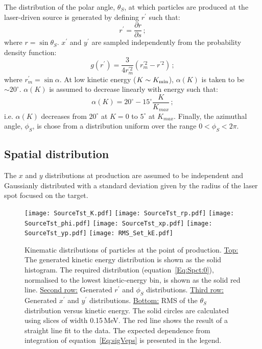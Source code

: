 The distribution of the polar angle, $\theta_S$, at which particles
are produced at the laser-driven source is generated by defining
$r^\prime$ such that:
\begin{equation}
  r^\prime = \frac{\partial r}{\partial s}\,;
\end{equation}
where $r=\sin\theta_S$.
$x^\prime$ and $y^\prime$ are sampled independently from the
probability density function:
\begin{equation}
  g(r^\prime) = \frac{3}{4r^{\prime 2}_m} \left(r^{\prime 2}_m-r^{\prime 2} \right)\,;
\end{equation}
where $r^\prime_m=\sin\alpha$.
At low kinetic energy ($K \sim K_{\rm min}$),
$\alpha(K)$ is taken to be $\sim 20^\circ$.
$\alpha(K)$ is assumed to decrease linearly with energy such
that:
\begin{equation}
  \alpha(K) =
                20^\circ - 15^\circ \frac{K}{K_{max}} \, ;
  \label{Eq:sigVeps}
\end{equation}
i.e. $\alpha(K)$ decreases from $20^\circ$ at $K=0$
to $5^\circ$ at $K_{max}$.
Finally, the azimuthal angle, $\phi_S$, is chose from a distribution
uniform over the range $0 < \phi_S < 2\pi$.

\subsection{Spatial distribution}

The $x$ and $y$ distributions at production are assumed to be
independent and Gaussianly distributed with a standard deviation given
by the radius of the laser spot focused on the target.

\begin{figure}
  \begin{center}
    \texttt{[image: SourceTst\_K.pdf]}
    \texttt{[image: SourceTst\_rp.pdf]}
    \texttt{[image: SourceTst\_phi.pdf]}
    \texttt{[image: SourceTst\_xp.pdf]}
    \texttt{[image: SourceTst\_yp.pdf]}
    \texttt{[image: RMS\_Set\_kE.pdf]}
  \end{center}
  \caption{Kinematic distributions of particles at the point of
    production.
    \underline{Top:} The generated kinetic energy distribution is shown
    as the solid histogram. 
    The required distribution (equation~\ref{Eq:Spct:0}), normalised
    to the lowest kinetic-energy bin, is shown as the solid red line.
    \underline{Second row:} Generated $r^\prime$ and $\phi_S$
    distributions. 
    \underline{Third row:} Generated $x^\prime$ and $y^\prime$
    distributions. 
    \underline{Bottom:} RMS of the $\theta_S$ distribution versus
    kinetic energy.
    The solid circles are calculated using slices of width 0.15\,MeV.
    The red line shows the result of a straight line fit to the data.
    The expected dependence from integration of
    equation~\ref{Eq:sigVeps} is presented in the legend.
  }
  \label{Fig:LsrDrvSrc:Dists}
\end{figure}

